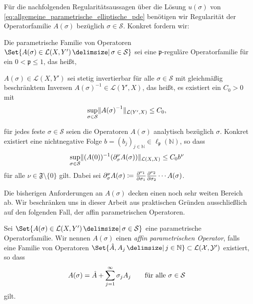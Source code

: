 Für die nachfolgenden Regularitätsaussagen über die Lösung $u(\sigma)$ von \eqref{eq:allgemeine_parametrische_elliptische_pde} benötigen wir Regularität der Operatorfamilie $A(\sigma)$ bezüglich $\sigma \in \mathcal S$.
Konkret fordern wir:
\begin{Annahme}
\label{thm:kunoth:assumption1}
    Die parametrische Familie von Operatoren
    $\Set{ A(\sigma) \in \mathcal L(X, Y') \given \sigma \in \mathcal S }$ sei eine $\mathfrak p$-reguläre Operatorfamilie für ein $0 < \mathfrak p \leq 1$, das heißt,
    \begin{thmenumerate}
        \item $A(\sigma) \in \mathcal L(X, Y')$ sei stetig invertierbar für alle $\sigma \in \mathcal S$ mit gleichmäßig beschränktem Inversen $A{(\sigma)}^{-1} \in \mathcal L(Y', X)$, das heißt, es existiert ein $C_{0} > 0$ mit
        \begin{equation}
            \sup_{\sigma \in \mathcal S} \lVert A{(\sigma)}^{-1}\rVert_{\mathcal L(Y', X)} \leq C_{0},
        \end{equation}
        \item für jedes feste $\sigma \in \mathcal S$ seien die Operatoren $A(\sigma)$ analytisch bezüglich $\sigma$.
        Konkret existiert eine nichtnegative Folge $b = (b_{j})_{j \in \mathbb{N}} \in \ell_{\mathfrak p}(\mathbb{N})$, so dass
        \begin{equation}
            \sup_{\sigma \in \mathcal S} \lVert(A{(0)})^{-1}(\partial^{\nu}_{\sigma} A(\sigma))\rVert_{\mathcal L(X, X)} \leq C_{0} b^{\nu}
        \end{equation}
        für alle $\nu \in \mathfrak F \setminus \{ 0 \}$ gilt.
        Dabei sei $\partial^{\nu}_{\sigma} A(\sigma) \coloneqq \frac{\partial^{\nu_{1}}}{\partial \sigma_{1}} \frac{\partial^{\nu_{2}}}{\partial \sigma_{2}} \cdots A(\sigma)$.
    \end{thmenumerate}
\end{Annahme}

Die bisherigen Anforderungen an $A(\sigma)$ decken einen noch sehr weiten Bereich ab.
Wir beschränken uns in dieser Arbeit aus praktischen Gründen ausschließlich auf den folgenden Fall, der affin parametrischen Operatoren.

\begin{Definition}
    Sei $\Set{ A(\sigma) \in \mathcal L(X, Y') \given \sigma \in \cal S }$ eine parametrische Operatorfamilie.
    Wir nennen $A(\sigma)$ einen \emph{affin parametrischen Operator}, falls eine Familie von Operatoren $\Set{ \hat A, A_{j} \given j \in \mathbb{N} } \subset \cal L(X, Y')$ existiert, so dass
    \begin{equation}
        \label{eq:all_affiner_operator}
        A(\sigma) = \hat A + \sum_{j = 1}^{\infty} \sigma_{j} A_{j} \qquad\fa \sigma \in \mathcal S
    \end{equation}
    gilt.
\end{Definition}

